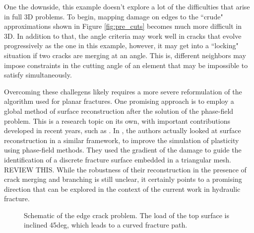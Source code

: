One the downside, this example doesn't explore a lot of the difficulties that arise in full 3D problems. To begin, mapping damage on edges to the ``crude" approximations shown in Figure \ref{fig:pre_cuts} becomes much more difficult in 3D. In addition to that, the angle criteria may work well in cracks that evolve progressively as the one in this example, however, it may get into a ``locking" situation if two cracks are merging at an angle. This is, different neighbors may impose constraints in the cutting angle of an element that may be impossible to satisfy simultaneously. 

Overcoming these challegens likely requires a more severe reformulation of the algorithm used for planar fractures. One promising approach is to employ a global method of surface reconstruction after the solution of the phase-field problem. This is a research topic on its own, with important contributions developed in recent years, such as \cite{}. In \cite{}, the authors actually looked at surface reconstruction in a similar framework, to improve the simulation of plasticity using phase-field methods. They used the gradient of the damage to guide the identification of a discrete fracture surface embedded in a triangular mesh. REVIEW THIS. While the robustness of their reconstruction in the presence of crack merging and branching is still unclear, it certainly points to a promising direction that can be explored in the context of the current work in hydraulic fracture.

\begin{figure}[ht]
    \centering
    \caption{Schematic of the edge crack problem. The load of the top surface is inclined 45deg, which leads to a curved fracture path.}
    \label{fig:nonplanar_schematic}
\end{figure}

